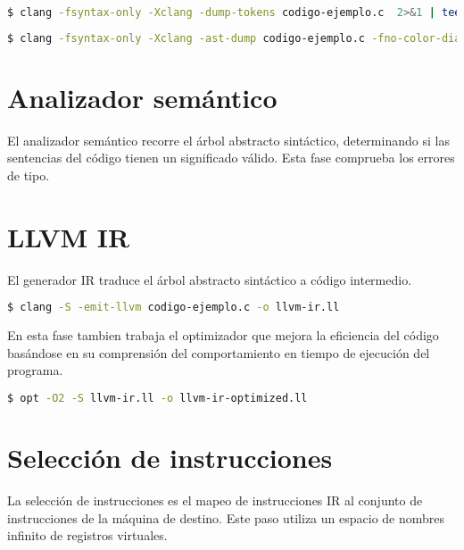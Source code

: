 \begin{lstlisting}[label=comandoC, caption= Comando de compilación para obtener \emph{tokens} \cite{repositorio} para CLANG/LLVM., language=bash]
    $ clang -fsyntax-only -Xclang -dump-tokens codigo-ejemplo.c  2>&1 | tee tokens  \end{lstlisting}

\begin{lstlisting}[label=comandoC, caption= Comando de compilación para obtener ast \cite{repositorio} para CLANG/LLVM., language=bash]
    $ clang -fsyntax-only -Xclang -ast-dump codigo-ejemplo.c -fno-color-diagnostics > ast \end{lstlisting}

\section{Analizador semántico}
El analizador semántico recorre el árbol abstracto sintáctico, 
determinando si las sentencias del código tienen un significado válido. 
Esta fase comprueba los errores de tipo.

\section{LLVM IR}
El generador IR traduce el árbol abstracto sintáctico a código intermedio\cite{LLVMIR}. 

\begin{lstlisting}[label=comandoC, caption= Comando de compilación para obtener llvm-ir.ll \cite{repositorio} para CLANG/LLVM., language=bash]
    $ clang -S -emit-llvm codigo-ejemplo.c -o llvm-ir.ll \end{lstlisting}

En esta fase tambien trabaja el optimizador que mejora la eficiencia del código basándose 
en su comprensión del comportamiento en tiempo de ejecución del programa. 

\begin{lstlisting}[label=comandoC, caption= Comando de compilación para obtener llvm-ir-optimizedd.ll \cite{repositorio} para CLANG/LLVM., language=bash]
    $ opt -O2 -S llvm-ir.ll -o llvm-ir-optimized.ll \end{lstlisting}

\section{Selección de instrucciones} 

La selección de instrucciones es el mapeo de instrucciones IR al conjunto 
de instrucciones de la máquina de destino. Este paso utiliza un espacio de 
nombres infinito de registros virtuales.

